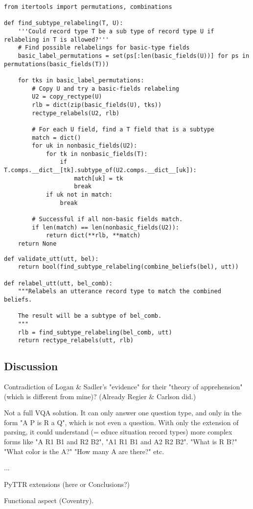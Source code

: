 \begin{lstlisting}[label=lst:subtyperlb, caption=Implementation of the relabel-subtype relation.]
from itertools import permutations, combinations

def find_subtype_relabeling(T, U):
    '''Could record type T be a sub type of record type U if relabeling in T is allowed?'''
    # Find possible relabelings for basic-type fields
    basic_label_permutations = set(ps[:len(basic_fields(U))] for ps in permutations(basic_fields(T)))
    
    for tks in basic_label_permutations:
        # Copy U and try a basic-fields relabeling
        U2 = copy_rectype(U)
        rlb = dict(zip(basic_fields(U), tks))
        rectype_relabels(U2, rlb)
        
        # For each U field, find a T field that is a subtype
        match = dict()
        for uk in nonbasic_fields(U2):
            for tk in nonbasic_fields(T):
                if T.comps.__dict__[tk].subtype_of(U2.comps.__dict__[uk]):
                    match[uk] = tk
                    break
            if uk not in match:
                break

        # Successful if all non-basic fields match.
        if len(match) == len(nonbasic_fields(U2)):
            return dict(**rlb, **match)
    return None
\end{lstlisting}

\begin{lstlisting}
def validate_utt(utt, bel):
    return bool(find_subtype_relabeling(combine_beliefs(bel), utt))

def relabel_utt(utt, bel_comb):
    """Relabels an utterance record type to match the combined beliefs.
    
    The result will be a subtype of bel_comb.
    """
    rlb = find_subtype_relabeling(bel_comb, utt)
    return rectype_relabels(utt, rlb)
\end{lstlisting}

\subsection{Discussion}
\label{sec:discussion}

Contradiction of Logan \& Sadler's "evidence" for their "theory of apprehension" (which is different from mine)? (Already Regier \& Carlson did.)

Not a full VQA solution.
It can only answer one question type, and only in the form "A P is R a Q", which is not even a question.
With only the extension of parsing, it could understand (= educe situation record types) more complex forms like "A R1 B1 and R2 B2", "A1 R1 B1 and A2 R2 B2".
"What is R B?"
"What color is the A?"
"How many A are there?" etc.

...

PyTTR extensions (here or Conclusions?)

Functional aspect (Coventry).
